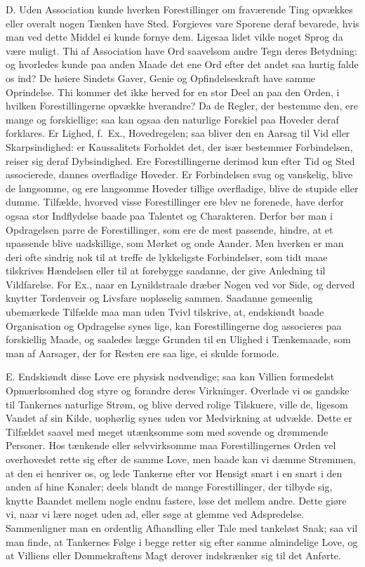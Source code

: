 \documentclass[12pt,a4paper]{article}
\newcommand{\opage}[1]{\marginnote{\footnotesize\textit{[#1]}}}
\begin{document}
D. Uden Association kunde hverken Forestillinger om fraværende Ting opvækkes eller
overalt nogen Tænken have Sted. Forgieves vare Sporene deraf bevarede, hvis man ved dette
Middel ei kunde fornye dem. Ligesaa lidet vilde noget Sprog da være muligt. Thi af
Association have Ord saavelsom andre Tegn deres Betydning: og hvorledes kunde paa anden
Maade det ene Ord efter det andet saa hurtig falde os ind? De høiere Sindets Gaver, Genie
og Opfindelseskraft have samme Oprindelse. Thi kommer det ikke herved for en stor Deel an
paa den Orden, i hvilken Forestillingerne opvække hverandre? Da de Regler, der bestemme
den, ere mange og forskiellige; saa kan ogsaa den naturlige Forskiel paa Hoveder deraf
forklares. Er Lighed, f.~Ex., Hovedregelen; saa bliver den en Aarsag til Vid eller
Skarpsindighed: er Kaussalitets Forholdet det, der især bestemmer Forbindelsen, reiser
sig deraf Dybsindighed. Ere Forestillingerne derimod kun efter Tid og Sted associerede,
dannes overfladige Hoveder. Er Forbindelsen svag og vanskelig, blive de langsomme, og ere
langsomme Hoveder tillige overfladige, blive de stupide eller dumme. Tilfælde, hvorved
visse Forestillinger ere blev%
\opage{98}ne forenede, have derfor ogsaa stor Indflydelse baade paa Talentet og Charakteren. Derfor
bør man i Opdragelsen parre de Forestillinger, som ere de mest passende, hindre, at et
upassende blive uadskillige, som Mørket og onde Aander. Men hverken er man deri ofte
sindrig nok til at treffe de lykkeligste Forbindelser, som tidt maae tilskrives
Hændelsen eller til at forebygge saadanne, der give Anledning til Vildfarelse. For Ex.,
naar en Lynildstraale dræber Nogen ved vor Side, og derved knytter Tordenveir og Livsfare
uopløselig sammen. Saadanne gemeenlig ubemærkede Tilfælde maa man uden Tvivl tilskrive,
at, endskiøndt baade Organisation og Opdragelse synes lige, kan Forestillingerne dog
associeres paa forskiellig Maade, og saaledes lægge Grunden til en Ulighed i Tænkemaade,
som man af Aarsager, der for Resten ere saa lige, ei skulde formode.

E. Endskiøndt disse Love ere physisk nødvendige; saa kan Villien formedelst Opmærksomhed
dog styre og forandre deres Virkninger. Overlade vi os gandske til Tankernes naturlige
Strøm, og blive derved rolige Tilskuere, ville de, ligesom Vandet af sin Kilde, uophørlig
synes uden vor Medvirkning at udvælde. Dette er Tilfældet saavel med meget utænksomme som
med sovende og drømmende Personer. Hos tænkende eller selvvirksomme maa Forestillingernes
Orden vel overhovedet rette sig efter de samme Love, men baade kan vi dæmme Strømmen, at
den ei henriver os, og lede Tankerne
\opage{99} efter vor Hensigt snart i en snart i den anden af hine Kanaler; deels blandt de mange
Forestillinger, der tilbyde sig, knytte Baandet mellem nogle endnu fastere, løse det
mellem andre. Dette giøre vi, naar vi lære noget uden ad, eller søge at glemme ved
Adspredelse. Sammenligner man en ordentlig Afhandling eller Tale med tankeløst Snak; saa
vil man finde, at Tankernes Følge i begge retter sig efter samme almindelige Love, og at
Villiens eller Dømmekraftens Magt derover indskrænker sig til det Anførte.
\end{document}
